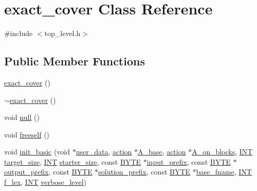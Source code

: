 \hypertarget{classexact__cover}{}\section{exact\+\_\+cover Class Reference}
\label{classexact__cover}


{\ttfamily \#include $<$top\+\_\+level.\+h$>$}

\subsection*{Public Member Functions}
\begin{DoxyCompactItemize}
\item 
\mbox{\hyperlink{classexact__cover_a86e6e945c496226c943d004e21c34545}{exact\+\_\+cover}} ()
\item 
\mbox{\hyperlink{classexact__cover_a11e2485369f3c825c879c7d31770bb49}{$\sim$exact\+\_\+cover}} ()
\item 
void \mbox{\hyperlink{classexact__cover_a88180f7d6fc5c4ac81b9b60f381dd39f}{null}} ()
\item 
void \mbox{\hyperlink{classexact__cover_ab3fdbad938ba36644e262b620fca8def}{freeself}} ()
\item 
void \mbox{\hyperlink{classexact__cover_a188961cda99906946f33aea0bef3c6ce}{init\+\_\+basic}} (void $\ast$\mbox{\hyperlink{classexact__cover_ac1543bac5197f35715ff30402385ae4b}{user\+\_\+data}}, \mbox{\hyperlink{classaction}{action}} $\ast$\mbox{\hyperlink{classexact__cover_aed89508b38628ac50b3dde7dfede3ff9}{A\+\_\+base}}, \mbox{\hyperlink{classaction}{action}} $\ast$\mbox{\hyperlink{classexact__cover_a4575200536fca630a03696141f78d367}{A\+\_\+on\+\_\+blocks}}, \mbox{\hyperlink{galois_8h_a09fddde158a3a20bd2dcadb609de11dc}{I\+NT}} \mbox{\hyperlink{classexact__cover_a368eff6db9702763a0931b959301e091}{target\+\_\+size}}, \mbox{\hyperlink{galois_8h_a09fddde158a3a20bd2dcadb609de11dc}{I\+NT}} \mbox{\hyperlink{classexact__cover_a2930a79e660bf9afa39c36e5715b00f4}{starter\+\_\+size}}, const \mbox{\hyperlink{galois_8h_ab6cc7b4aeb6ea31aba2b3fbfc83ff5e6}{B\+Y\+TE}} $\ast$\mbox{\hyperlink{classexact__cover_a6b8795af812c7d8a13567dd533e7692e}{input\+\_\+prefix}}, const \mbox{\hyperlink{galois_8h_ab6cc7b4aeb6ea31aba2b3fbfc83ff5e6}{B\+Y\+TE}} $\ast$\mbox{\hyperlink{classexact__cover_a798cf43561b3cfb9502a0be28f45b084}{output\+\_\+prefix}}, const \mbox{\hyperlink{galois_8h_ab6cc7b4aeb6ea31aba2b3fbfc83ff5e6}{B\+Y\+TE}} $\ast$\mbox{\hyperlink{classexact__cover_a1d64be8afc172a2c2b88084c9acb873d}{solution\+\_\+prefix}}, const \mbox{\hyperlink{galois_8h_ab6cc7b4aeb6ea31aba2b3fbfc83ff5e6}{B\+Y\+TE}} $\ast$\mbox{\hyperlink{classexact__cover_ac567172bdce6ae702e4a08f01e2c723e}{base\+\_\+fname}}, \mbox{\hyperlink{galois_8h_a09fddde158a3a20bd2dcadb609de11dc}{I\+NT}} \mbox{\hyperlink{classexact__cover_a8090185b57af9c673cf7158d38e18226}{f\+\_\+lex}}, \mbox{\hyperlink{galois_8h_a09fddde158a3a20bd2dcadb609de11dc}{I\+NT}} \mbox{\hyperlink{simeon_8_c_a818073fbcc2f439e7c56952f67386122}{verbose\+\_\+level}})

\end{DoxyCompactItemize}
